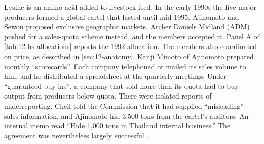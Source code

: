 Lysine is an amino acid added to livestock feed. In the early 1990s the five major producers formed a global cartel
that lasted until mid-1995. Ajinomoto and Sewon proposed exclusive geographic markets. Archer Daniels Midland (ADM)
pushed for a sales-quota scheme instead, and the members accepted it. Panel A of \cref{tab:12-hs-allocations}
reports the 1992 allocation. The members also coordinated on price, as described in \cref{sec:12-anatomy}. Kanji
Mimoto of Ajinomoto prepared monthly ``scorecards''. Each company telephoned or mailed its sales volume to him, and
he distributed a spreadsheet at the quarterly meetings. Under ``guaranteed buy-ins'', a company that sold more than
its quota had to buy output from producers below quota. There were isolated reports of underreporting. Cheil told
the Commission that it had supplied ``misleading'' sales information, and Ajinomoto hid 3,500 tons from the
cartel's auditors. An internal memo read ``Hide 1,000 tons in Thailand internal business.'' The agreement was
nevertheless largely successful \citep[pp.~2425--2426]{HarringtonSkrzypacz2011}.

